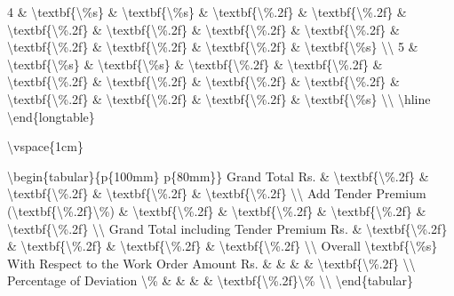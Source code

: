4 \& \textbackslash{}textbf\{\textbackslash{}\%s\} \& \textbackslash{}textbf\{\textbackslash{}\%s\} \& \textbackslash{}textbf\{\textbackslash{}\%.2f\} \& \textbackslash{}textbf\{\textbackslash{}\%.2f\} \& \textbackslash{}textbf\{\textbackslash{}\%.2f\} \& \textbackslash{}textbf\{\textbackslash{}\%.2f\} \& \textbackslash{}textbf\{\textbackslash{}\%.2f\} \& \textbackslash{}textbf\{\textbackslash{}\%.2f\} \& \textbackslash{}textbf\{\textbackslash{}\%.2f\} \& \textbackslash{}textbf\{\textbackslash{}\%.2f\} \& \textbackslash{}textbf\{\textbackslash{}\%.2f\} \& \textbackslash{}textbf\{\textbackslash{}\%s\} \textbackslash{}\textbackslash{}
5 \& \textbackslash{}textbf\{\textbackslash{}\%s\} \& \textbackslash{}textbf\{\textbackslash{}\%s\} \& \textbackslash{}textbf\{\textbackslash{}\%.2f\} \& \textbackslash{}textbf\{\textbackslash{}\%.2f\} \& \textbackslash{}textbf\{\textbackslash{}\%.2f\} \& \textbackslash{}textbf\{\textbackslash{}\%.2f\} \& \textbackslash{}textbf\{\textbackslash{}\%.2f\} \& \textbackslash{}textbf\{\textbackslash{}\%.2f\} \& \textbackslash{}textbf\{\textbackslash{}\%.2f\} \& \textbackslash{}textbf\{\textbackslash{}\%.2f\} \& \textbackslash{}textbf\{\textbackslash{}\%.2f\} \& \textbackslash{}textbf\{\textbackslash{}\%s\} \textbackslash{}\textbackslash{}
\textbackslash{}hline
\textbackslash{}end\{longtable\}

\textbackslash{}vspace\{1cm\}

\textbackslash{}begin\{tabular\}\{p\{100mm\} p\{80mm\}\}
Grand Total Rs. \& \textbackslash{}textbf\{\textbackslash{}\%.2f\} \& \textbackslash{}textbf\{\textbackslash{}\%.2f\} \& \textbackslash{}textbf\{\textbackslash{}\%.2f\} \& \textbackslash{}textbf\{\textbackslash{}\%.2f\} \textbackslash{}\textbackslash{}
Add Tender Premium (\textbackslash{}textbf\{\textbackslash{}\%.2f\}\textbackslash{}\%) \& \textbackslash{}textbf\{\textbackslash{}\%.2f\} \& \textbackslash{}textbf\{\textbackslash{}\%.2f\} \& \textbackslash{}textbf\{\textbackslash{}\%.2f\} \& \textbackslash{}textbf\{\textbackslash{}\%.2f\} \textbackslash{}\textbackslash{}
Grand Total including Tender Premium Rs. \& \textbackslash{}textbf\{\textbackslash{}\%.2f\} \& \textbackslash{}textbf\{\textbackslash{}\%.2f\} \& \textbackslash{}textbf\{\textbackslash{}\%.2f\} \& \textbackslash{}textbf\{\textbackslash{}\%.2f\} \textbackslash{}\textbackslash{}
Overall \textbackslash{}textbf\{\textbackslash{}\%s\} With Respect to the Work Order Amount Rs. \& \& \& \& \textbackslash{}textbf\{\textbackslash{}\%.2f\} \textbackslash{}\textbackslash{}
Percentage of Deviation \textbackslash{}\% \& \& \& \& \textbackslash{}textbf\{\textbackslash{}\%.2f\}\textbackslash{}\% \textbackslash{}\textbackslash{}
\textbackslash{}end\{tabular\}

